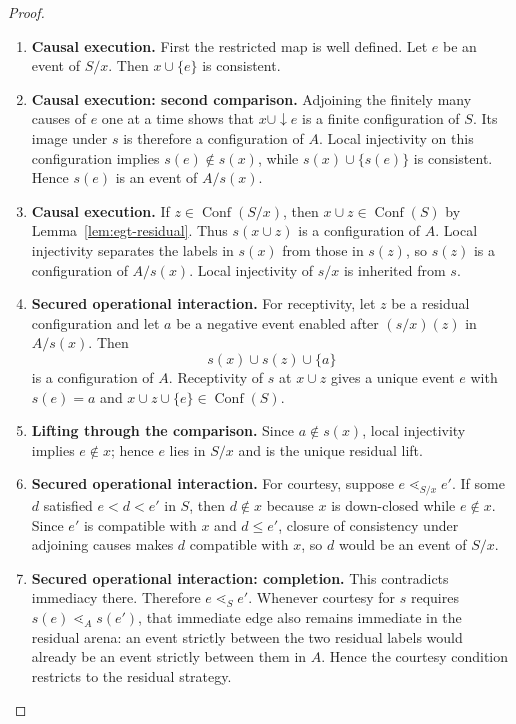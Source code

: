 \documentclass[11pt,a4paper]{article}
\numberwithin{equation}{section}
\theoremstyle{definition}
\theoremstyle{remark}
\theoremstyle{plain}
\begin{document}
\begin{proof}
\leavevmode
\begin{enumerate}[label=\textup{(\arabic*)},leftmargin=*,itemsep=4pt,topsep=3pt]
  \item \textbf{Causal execution.} First the restricted map is well defined. Let $e$ be an event of $S/x$. Then $x\cup\{e\}$ is consistent.
  \item \textbf{Causal execution: second comparison.} Adjoining the finitely many causes of $e$
one at a time shows that $x\cup\downarrow e$ is a finite configuration of
$S$. Its image under $s$ is therefore a configuration of $A$. Local
injectivity on this configuration implies $s(e)\notin s(x)$, while
$s(x)\cup\{s(e)\}$ is consistent. Hence $s(e)$ is an event of $A/s(x)$.
  \item \textbf{Causal execution.} If $z\in\operatorname{Conf}(S/x)$, then
$x\cup z\in\operatorname{Conf}(S)$ by
Lemma~\ref{lem:egt-residual}. Thus $s(x\cup z)$ is a configuration of $A$. Local injectivity separates the labels in $s(x)$ from those in $s(z)$, so
$s(z)$ is a configuration of $A/s(x)$. Local injectivity of $s/x$ is
inherited from $s$.
  \item \textbf{Secured operational interaction.} For receptivity, let $z$ be a residual configuration and let $a$ be a
negative event enabled after $(s/x)(z)$ in $A/s(x)$. Then
\[
 s(x)\cup s(z)\cup\{a\}
\]
is a configuration of $A$. Receptivity of $s$ at $x\cup z$ gives a unique
event $e$ with $s(e)=a$ and
$x\cup z\cup\{e\}\in\operatorname{Conf}(S)$.
  \item \textbf{Lifting through the comparison.} Since $a\notin s(x)$, local
injectivity implies $e\notin x$; hence $e$ lies in $S/x$ and is the unique
residual lift.
  \item \textbf{Secured operational interaction.} For courtesy, suppose $e\lessdot_{S/x}e'$. If some $d$ satisfied
$e<d<e'$ in $S$, then $d\notin x$ because $x$ is down-closed while
$e\notin x$. Since $e'$ is compatible with $x$ and $d\leq e'$, closure of
consistency under adjoining causes makes $d$ compatible with $x$, so $d$
would be an event of $S/x$.
  \item \textbf{Secured operational interaction: completion.} This contradicts immediacy there. Therefore
$e\lessdot_Se'$. Whenever courtesy for $s$ requires
$s(e)\lessdot_A s(e')$, that immediate edge also remains immediate in the
residual arena: an event strictly between the two residual labels would
already be an event strictly between them in $A$. Hence the courtesy
condition restricts to the residual strategy.
\end{enumerate}
\end{proof}
\end{document}
